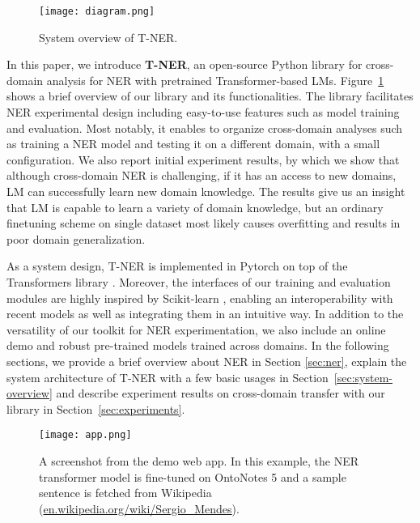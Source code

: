 \documentclass[11pt,a4paper]{article}
\begin{document}
\begin{figure}[!t]
    \centering
    \texttt{[image: diagram.png]}
    \caption{System overview of T-NER.}
    \label{fig:diagram}
\end{figure}

In this paper, we introduce {\bf T-NER}, an open-source Python library for cross-domain analysis for NER with pretrained Transformer-based LMs.
Figure~\ref{fig:diagram} shows a brief overview of our library and its functionalities.
The library facilitates NER experimental design including easy-to-use features such as model training and evaluation. Most notably, it enables to organize cross-domain analyses such as training a NER model and testing it on a different domain, with a small configuration.
We also report initial experiment results, by which we show that although cross-domain NER is challenging, if it has an access to new domains, LM can successfully learn new domain knowledge. The results give us an insight that LM is capable to learn a variety of domain knowledge, but an ordinary finetuning scheme on single dataset most likely causes overfitting and results in poor domain generalization.



As a system design, T-NER is implemented in Pytorch \citep{paszke2019pytorch} on top of the Transformers library \citep{Wolf2019HuggingFacesTS}. Moreover, the interfaces of our training and evaluation modules are highly inspired by Scikit-learn \citep{pedregosa2011scikit}, enabling an interoperability with recent models as well as integrating them in an intuitive way. In addition to the versatility of our toolkit for NER experimentation, we also include an online demo and robust pre-trained models trained across domains.
In the following sections, we provide a brief overview about NER in Section \ref{sec:ner}, explain the system architecture of T-NER with a few basic usages in Section~\ref{sec:system-overview} and describe experiment results on cross-domain transfer with our library in Section~\ref{sec:experiments}.

\begin{figure*}[ht]
    \centering
\texttt{[image: app.png]}
    \caption{A screenshot from the demo web app. In this example, the NER transformer model is fine-tuned on OntoNotes 5 and a sample sentence is fetched from Wikipedia (\url{en.wikipedia.org/wiki/Sergio_Mendes}).}
    \label{fig:web_app}
\end{figure*}
\end{document}
